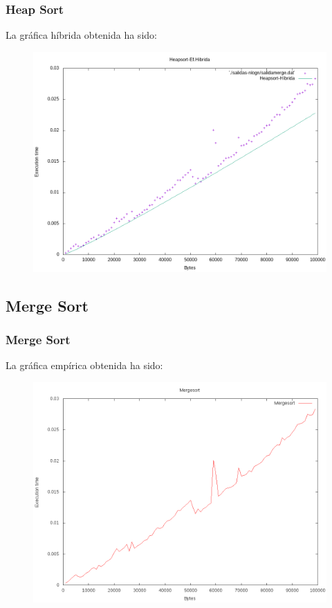 \documentclass{beamer}
\begin{document}
\begin{frame}
	\frametitle{Heap Sort}
	La gráfica híbrida obtenida ha sido:
	\begin{figure}
		\centering
		\includegraphics[width=0.7\linewidth]{imagenes/heapsort-hibrida.png}
		\caption{}
		\label{fig:E5}
	\end{figure}
\end{frame}
\subsection{Merge Sort}
\begin{frame}
	\frametitle{Merge Sort}
	La gráfica empírica obtenida ha sido:
	\begin{figure}
		\centering
		\includegraphics[width=0.7\linewidth]{imagenes/mergesort.png}
		\caption{}
		\label{fig:E4}
	\end{figure}
	
\end{frame}
\end{document}
